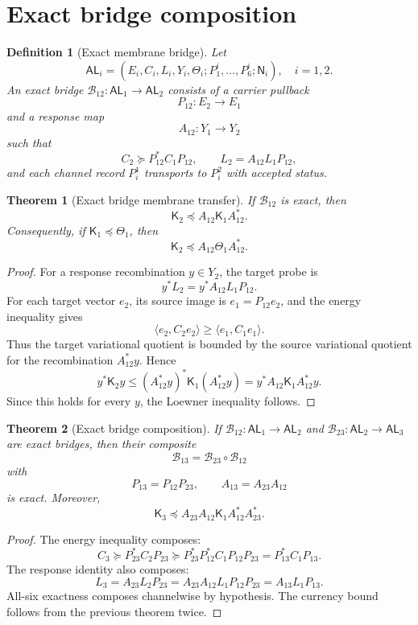\documentclass[11pt]{article}
\newtheorem{theorem}{Theorem}
\newtheorem{definition}{Definition}
\newcommand{\K}{\mathsf K}
\newcommand{\AL}{\mathsf{AL}}
\newcommand{\suc}{\succeq}
\begin{document}
\section{Exact bridge composition}
\begin{definition}[Exact membrane bridge]
Let
\[
\AL_i=(E_i,C_i,L_i,Y_i,\Theta_i;P_1^i,\ldots,P_6^i;\mathsf N_i),\quad i=1,2.
\]
An exact bridge $\mathcal B_{12}:\AL_1\to\AL_2$ consists of a carrier pullback
\[
P_{12}:E_2\to E_1
\]
and a response map
\[
A_{12}:Y_1\to Y_2
\]
such that
\[
C_2\suc P_{12}^*C_1P_{12},\qquad L_2=A_{12}L_1P_{12},
\]
and each channel record $P_i^1$ transports to $P_i^2$ with accepted status.
\end{definition}

\begin{theorem}[Exact bridge membrane transfer]
If $\mathcal B_{12}$ is exact, then
\[
\K_2\preceq A_{12}\K_1A_{12}^*.
\]
Consequently, if $\K_1\preceq\Theta_1$, then
\[
\K_2\preceq A_{12}\Theta_1A_{12}^*.
\]
\end{theorem}

\begin{proof}
For a response recombination $y\in Y_2$, the target probe is
\[
y^*L_2=y^*A_{12}L_1P_{12}.
\]
For each target vector $e_2$, its source image is $e_1=P_{12}e_2$, and the energy inequality gives
\[
\langle e_2,C_2e_2\rangle\ge \langle e_1,C_1e_1\rangle.
\]
Thus the target variational quotient is bounded by the source variational quotient for the recombination $A_{12}^*y$.  Hence
\[
y^*\K_2y\le (A_{12}^*y)^*\K_1(A_{12}^*y)=y^*A_{12}\K_1A_{12}^*y.
\]
Since this holds for every $y$, the Loewner inequality follows.
\end{proof}

\begin{theorem}[Exact bridge composition]
If $\mathcal B_{12}:\AL_1\to\AL_2$ and $\mathcal B_{23}:\AL_2\to\AL_3$ are exact bridges, then their composite
\[
\mathcal B_{13}=\mathcal B_{23}\circ\mathcal B_{12}
\]
with
\[
P_{13}=P_{12}P_{23},\qquad A_{13}=A_{23}A_{12}
\]
is exact.  Moreover,
\[
\K_3\preceq A_{23}A_{12}\K_1A_{12}^*A_{23}^*.
\]
\end{theorem}

\begin{proof}
The energy inequality composes:
\[
C_3\suc P_{23}^*C_2P_{23}\suc P_{23}^*P_{12}^*C_1P_{12}P_{23}=P_{13}^*C_1P_{13}.
\]
The response identity also composes:
\[
L_3=A_{23}L_2P_{23}=A_{23}A_{12}L_1P_{12}P_{23}=A_{13}L_1P_{13}.
\]
All-six exactness composes channelwise by hypothesis.  The currency bound follows from the previous theorem twice.
\end{proof}
\end{document}
